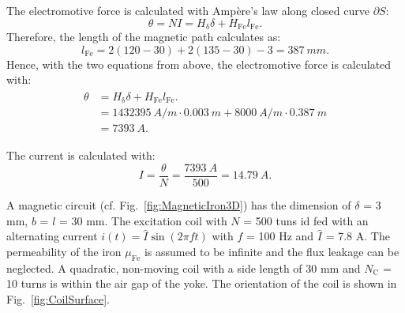 \begin{solutionblock}

    The electromotive force is calculated with Ampère's law along closed curve $\partial S$:
    \begin{equation}
        \theta = N I
        = H_{\updelta} \delta + H_{\mathrm{Fe}} l_{\mathrm{Fe}}.
    \end{equation}
    Therefore, the length of the magnetic path calculates as:
    \begin{equation}
        l_{\mathrm{Fe}} = 2(120-30) + 2(135-30)-3 = 387 \ \si{mm}.
    \end{equation}
    Hence, with the two equations from above, the electromotive force is calculated with:
    \begin{align}
        \begin{split}
            \theta &= H_{\updelta} \delta + H_{\mathrm{Fe}} l_{\mathrm{Fe}}.\\
            &= 1432395 \ \si{A/m} \cdot 0.003 \ \si{m} + 8000 \ \si{A/m} \cdot 0.387 \ \si{m} \\
            &= 7393 \ \si{A}.
        \end{split}
    \end{align}

\end{solutionblock}




\begin{solutionblock}
    The current is calculated with:
    \begin{equation}
        I = \frac{\theta}{N} = \frac{7393 \ \si{A}}{500} = 14.79 \ \si{A}.
    \end{equation}

\end{solutionblock}








A magnetic circuit (cf. Fig.~\ref{fig:MagneticIron3D}) has the dimension of $\delta$ = 3 mm, $b$ = $l$ = 30 mm. The excitation coil with $N$ = 500 tuns id fed with an alternating current $i(t) = \hat{I} \sin(2\pi f t)$ with $f$ = 100 Hz and $\hat{I}$ = 7.8 A.
The permeability of the iron $\mu_{\mathrm{Fe}}$ is assumed to be infinite and the flux leakage can be neglected.
A quadratic, non-moving coil with a side length of 30 mm and $N_{\mathrm{C}}$ = 10 turns is within the air gap of the yoke. The orientation of the coil is shown in Fig.~\ref{fig:CoilSurface}. 

